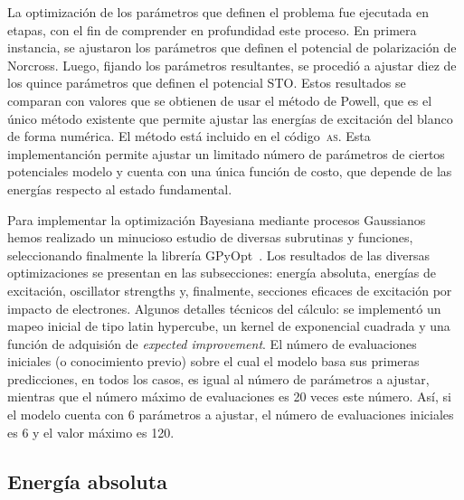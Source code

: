 La optimización de los parámetros que definen el problema fue ejecutada 
en etapas, con el fin de comprender en profundidad este proceso. En 
primera instancia, se ajustaron los parámetros que definen el potencial 
de polarización de Norcross. Luego, fijando los parámetros resultantes, 
se procedió a ajustar diez de los quince parámetros que definen el 
potencial STO. Estos resultados se comparan con valores que se obtienen 
de usar el método de Powell, que es el único método existente que 
permite ajustar las energías de excitación del blanco de forma numérica. 
El método está incluido en el código~\textsc{as}. Esta implementanción 
permite ajustar un limitado número de parámetros de ciertos potenciales 
modelo y cuenta con una única función de costo, que depende de las 
energías respecto al estado fundamental.

Para implementar la optimización Bayesiana mediante procesos Gaussianos 
hemos realizado un minucioso estudio de diversas subrutinas y funciones, 
seleccionando finalmente la librería GPyOpt~\cite{GPyOpt}. Los 
resultados de las diversas optimizaciones se presentan en las 
subsecciones: energía absoluta, energías de excitación, oscillator 
strengths y, finalmente, secciones eficaces de excitación por impacto de 
electrones. 
Algunos detalles técnicos del cálculo: 
se implementó un mapeo inicial de tipo latin hypercube, un kernel de 
exponencial cuadrada y una función de adquisión de 
\textit{expected improvement}. El número de evaluaciones 
iniciales (o conocimiento previo) sobre el cual el modelo basa sus 
primeras predicciones, en todos los casos, es igual al número de 
parámetros a ajustar, mientras que el número máximo de evaluaciones es 
20 veces este número. Así, si el modelo cuenta con 6 parámetros a 
ajustar, el número de evaluaciones iniciales es 6 y el valor máximo es 
120.

\subsection{Energía absoluta}

